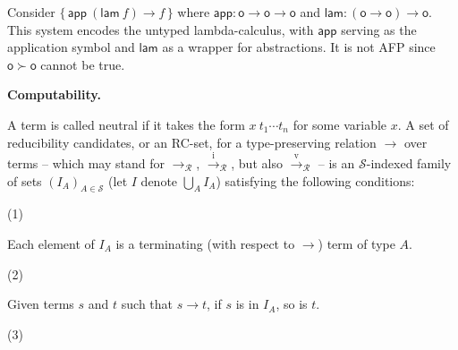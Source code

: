 \documentclass[10pt,a4paper]{amsart}
\begin{document}
 
 
Consider $\{\,{\mathsf{app}}\ {({\mathsf{lam}}\ {f})}\rightarrow f\,\}$ where $\mathsf{app}:\mathsf{o}\rightarrow\mathsf{o}\rightarrow\mathsf{o}$ and $\mathsf{lam}:(\mathsf{o}\rightarrow\mathsf{o})\rightarrow\mathsf{o}$. This system encodes the untyped lambda-calculus, with $\mathsf{app}$ serving as the application symbol and $\mathsf{lam}$ as a wrapper for abstractions. It is not AFP since $\mathsf{o}\succ\mathsf{o}$ cannot be true.\par
 
 
 
 
 
\par\medskip\noindent\textbf{Computability.}\par
 
 
A term is called neutral if it takes the form ${x}\ {{t}_{1}\cdots{t}_{n}}$ for some variable $x$. A set of reducibility candidates, or an RC-set, for a type-preserving relation $\rightarrow$ over terms – which may stand for $\rightarrow_{\mathcal{R}}$, $\xrightarrow{\scriptscriptstyle\mathrm{i}}_{\mathcal{R}}$, but also $\xrightarrow{\scriptscriptstyle\mathrm{v}}_{\mathcal{R}}$ – is an $\mathcal{S}$-indexed family of sets $(I_{A})_{A\in\mathcal{S}}$ (let $I$ denote $\bigcup_{A}I_{A}$) satisfying the following conditions:\par
  
\par\noindent  (1) 
 
Each element of $I_{A}$ is a terminating (with respect to $\rightarrow$) term of type $A$.\par
 
 
 
\par\noindent  (2) 
 
Given terms $s$ and $t$ such that $s\rightarrow t$, if $s$ is in $I_{A}$, so is $t$.\par
 
 
 
\par\noindent  (3) 
 
\end{document}
